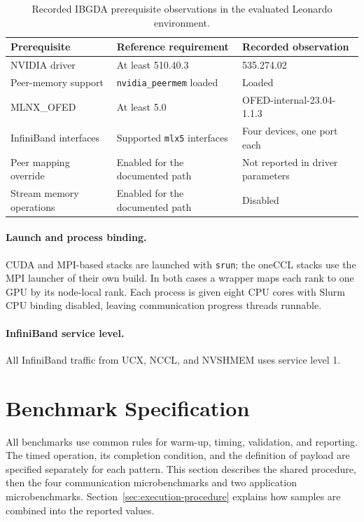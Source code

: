 \begin{table}[htbp]
\centering
\caption[IBGDA prerequisite observations on Leonardo]{Recorded IBGDA prerequisite observations in the evaluated Leonardo environment.}
\label{tab:m-ibgda-check}
\footnotesize
\begin{tabularx}{\textwidth}{lYY}
\toprule
Prerequisite & Reference requirement & Recorded observation\\
\midrule
NVIDIA driver & At least 510.40.3 & 535.274.02\\
Peer-memory support & \texttt{nvidia\_peermem} loaded & Loaded\\
MLNX\_OFED & At least 5.0 & OFED-internal-23.04-1.1.3\\
InfiniBand interfaces & Supported \texttt{mlx5} interfaces & Four devices, one port each\\
Peer mapping override & Enabled for the documented path & Not reported in driver parameters\\
Stream memory operations & Enabled for the documented path & Disabled\\
\bottomrule
\end{tabularx}
\end{table}

\paragraph{Launch and process binding.} CUDA and MPI-based stacks are launched with \texttt{srun}; the oneCCL stacks use the MPI launcher of their own build. In both cases a wrapper maps each rank to one GPU by its node-local rank. Each process is given eight CPU cores with Slurm CPU binding disabled, leaving communication progress threads runnable.

\paragraph{InfiniBand service level.} All InfiniBand traffic from UCX, NCCL, and NVSHMEM uses service level 1.

\section{Benchmark Specification}\label{sec:benchmark-method}

All benchmarks use common rules for warm-up, timing, validation, and reporting. The timed operation, its completion condition, and the definition of payload are specified separately for each pattern. This section describes the shared procedure, then the four communication microbenchmarks and two application microbenchmarks. Section~\ref{sec:execution-procedure} explains how samples are combined into the reported values.

